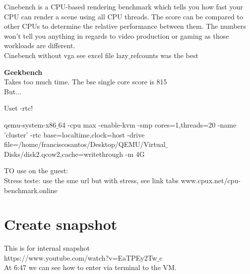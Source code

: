 \documentclass[11pt, a4paper, oneside]{article}
\theoremstyle{definition}
\begin{document}
     Cinebench is a CPU-based rendering benchmark which tells you how fast your CPU can render a scene using all CPU threads. The score can be compared to other CPUs to determine the relative performance between them. The numbers won't tell you anything in regards to video production or gaming as those workloads are different.\\
     
     Cinebench without vga see excel file
     lazy$\_$refcounts was the best
     
\textbf{Geekbench}\\
Takes too much time. The bse single core score is 815\\
But...

Uset -rtc!

qemu-system-x86$\_$64 -cpu max -enable-kvm -smp cores=1,threads=20 -name 'cluster' -rtc base=localtime,clock=host -drive file=/home/franciscosantos/Desktop/QEMU/Virtual$\_$Disks/disk2.qcow2,cache=writethrough -m 4G

TO use on the guest:\\
Stress teste: use the sme url but with stress, see link tabs
www.cpux.net/cpu-benchmark.online

\section{Create snapshot}
This is for internal snapshot\\
https://www.youtube.com/watch?v=EaTPEy2Tw$\_$c\\
At 6:47 we can see how to enter via terminal to the VM.\\
\end{document}
